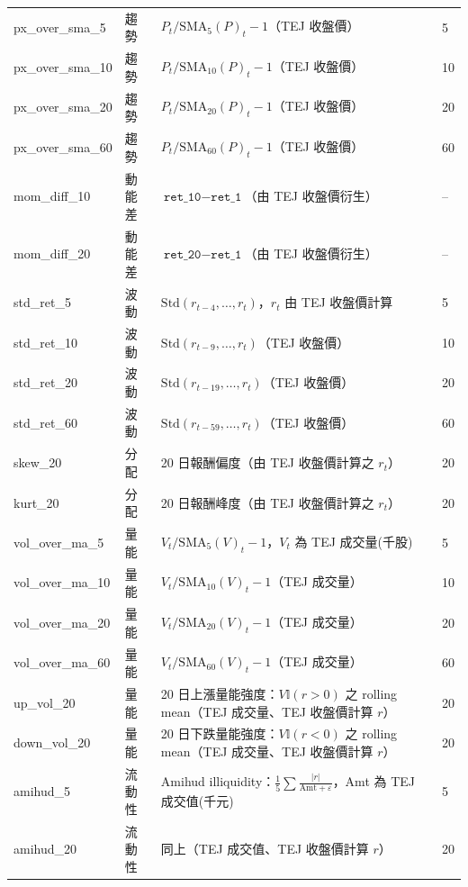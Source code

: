 \begin{longtable}{p{3.1cm} p{2.6cm} p{7.4cm} p{1.6cm}}
px\_over\_sma\_5  & 趨勢 & $P_t/\text{SMA}_5(P)_t-1$（TEJ 收盤價） & 5 \\
px\_over\_sma\_10 & 趨勢 & $P_t/\text{SMA}_{10}(P)_t-1$（TEJ 收盤價） & 10 \\
px\_over\_sma\_20 & 趨勢 & $P_t/\text{SMA}_{20}(P)_t-1$（TEJ 收盤價） & 20 \\
px\_over\_sma\_60 & 趨勢 & $P_t/\text{SMA}_{60}(P)_t-1$（TEJ 收盤價） & 60 \\

mom\_diff\_10 & 動能差 & $\texttt{ret\_10}-\texttt{ret\_1}$（由 TEJ 收盤價衍生） & -- \\
mom\_diff\_20 & 動能差 & $\texttt{ret\_20}-\texttt{ret\_1}$（由 TEJ 收盤價衍生） & -- \\

std\_ret\_5  & 波動 & $\text{Std}(r_{t-4},\ldots,r_t)$，$r_t$ 由 TEJ 收盤價計算 & 5 \\
std\_ret\_10 & 波動 & $\text{Std}(r_{t-9},\ldots,r_t)$（TEJ 收盤價） & 10 \\
std\_ret\_20 & 波動 & $\text{Std}(r_{t-19},\ldots,r_t)$（TEJ 收盤價） & 20 \\
std\_ret\_60 & 波動 & $\text{Std}(r_{t-59},\ldots,r_t)$（TEJ 收盤價） & 60 \\

skew\_20 & 分配 & 20 日報酬偏度（由 TEJ 收盤價計算之 $r_t$） & 20 \\
kurt\_20 & 分配 & 20 日報酬峰度（由 TEJ 收盤價計算之 $r_t$） & 20 \\

vol\_over\_ma\_5  & 量能 & $V_t/\text{SMA}_5(V)_t-1$，$V_t$ 為 TEJ 成交量(千股) & 5 \\
vol\_over\_ma\_10 & 量能 & $V_t/\text{SMA}_{10}(V)_t-1$（TEJ 成交量） & 10 \\
vol\_over\_ma\_20 & 量能 & $V_t/\text{SMA}_{20}(V)_t-1$（TEJ 成交量） & 20 \\
vol\_over\_ma\_60 & 量能 & $V_t/\text{SMA}_{60}(V)_t-1$（TEJ 成交量） & 60 \\

up\_vol\_20 & 量能 & 20 日上漲量能強度：$V\mathbb{I}(r>0)$ 之 rolling mean（TEJ 成交量、TEJ 收盤價計算 $r$） & 20 \\
down\_vol\_20 & 量能 & 20 日下跌量能強度：$V\mathbb{I}(r<0)$ 之 rolling mean（TEJ 成交量、TEJ 收盤價計算 $r$） & 20 \\

amihud\_5  & 流動性 & Amihud illiquidity：$\frac{1}{5}\sum \frac{|r|}{\text{Amt}+\varepsilon}$，Amt 為 TEJ 成交值(千元) & 5 \\
amihud\_20 & 流動性 & 同上（TEJ 成交值、TEJ 收盤價計算 $r$） & 20 \\


\end{longtable}

